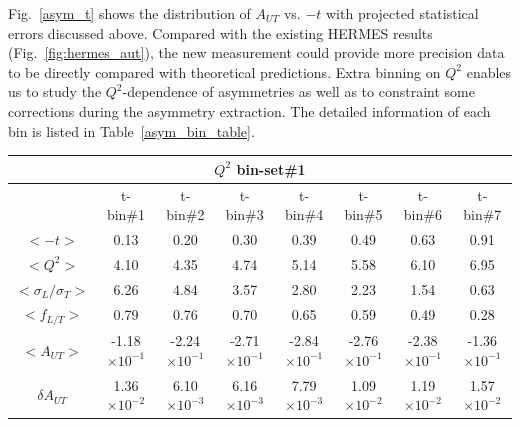 Fig.~\ref{asym_t} shows the distribution of $A_{UT}$ vs. $-t$ with projected
statistical errors discussed above. Compared with the existing HERMES results
(Fig.~\ref{fig:hermes_aut}), the new measurement could provide more precision
data to be directly compared with theoretical predictions. Extra binning on
$Q^{2}$ enables us to study the $Q^{2}$-dependence of asymmetries as well as to
constraint some corrections during the asymmetry extraction.  The detailed
information of each bin is listed in Table~\ref{asym_bin_table}.  
\begin{table}[!ht]
\centering
 \small
\begin{tabular}{|c|c|c|c|c|c|c|c|}
\hline
 \multicolumn{8}{|c|}{$Q^{2}$ bin-set\#1 } \\
\hline
      &  t-bin\#1 & t-bin\#2 & t-bin\#3 & t-bin\#4 & t-bin\#5 & t-bin\#6 & t-bin\#7 \\
  \hline
$<-t>$    &  0.13 &  0.20 & 0.30 & 0.39 & 0.49 & 0.63 & 0.91 \\
$<Q^{2}>$   &  4.10 &  4.35 & 4.74 & 5.14 & 5.58 & 6.10 & 6.95 \\
$<\sigma_{L}/\sigma_{T}>$    &  6.26 &  4.84 & 3.57 & 2.80 & 2.23 & 1.54 & 0.63 \\
$<f_{L/T}>$   &  0.79 &  0.76 & 0.70 & 0.65 & 0.59 & 0.49 & 0.28 \\
$<A_{UT}>$ &  -1.18$\times 10^{-1}$ &  -2.24$\times 10^{-1}$ & -2.71$\times 10^{-1}$ & -2.84$\times 10^{-1}$ & -2.76$\times 10^{-1}$ & -2.38$\times 10^{-1}$ & -1.36$\times 10^{-1}$ \\
$\delta A_{UT}$  &  1.36$\times 10^{-2}$ &  6.10$\times 10^{-3}$ & 6.16$\times 10^{-3}$ & 7.79$\times 10^{-3}$ & 1.09$\times 10^{-2}$ & 1.19$\times 10^{-2}$ & 1.57$\times 10^{-2}$ \\
\hline


\end{tabular}
\end{table}
